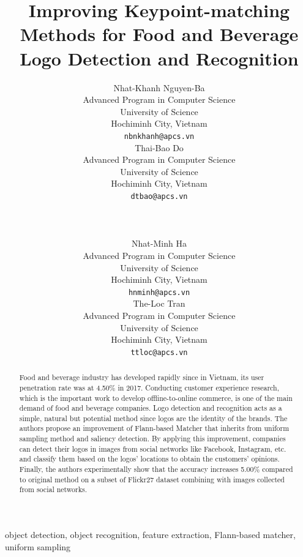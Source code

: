 \documentclass[letterpaper, 10 pt, conference]{ieeeconf}  %
\title{\LARGE \bf
Improving Keypoint-matching Methods for Food and Beverage \\Logo Detection and Recognition
}
\author{ \parbox{3 in}{\centering Nhat-Khanh Nguyen-Ba\\
		 Advanced Program in Computer Science\\
         University of Science\\
         Hochiminh City, Vietnam\\
         {\tt\small nbnkhanh@apcs.vn}}
         \hspace*{ 0.5 in}
         \parbox{3 in}{ \centering Thai-Bao Do\\
         Advanced Program in Computer Science\\
         University of Science\\
         Hochiminh City, Vietnam\\
         {\tt\small dtbao@apcs.vn}}
         \\
         \\
         \parbox{3 in}{ \centering Nhat-Minh Ha\\
         Advanced Program in Computer Science\\
         University of Science\\
         Hochiminh City, Vietnam\\
         {\tt\small hnminh@apcs.vn}}
         \hspace*{ 0.5 in}
         \parbox{3 in}{ \centering The-Loc Tran\\
         Advanced Program in Computer Science\\
         University of Science\\
         Hochiminh City, Vietnam\\
         {\tt\small ttloc@apcs.vn}}
}
\begin{document}
\maketitle
\thispagestyle{empty}
\pagestyle{empty}


\begin{abstract}

Food and beverage industry has developed rapidly since in Vietnam, its user penetration rate was at 4.50\% in 2017. Conducting customer experience research, which is the important work to develop offline-to-online commerce, is one of the main demand of food and beverage companies. Logo detection and recognition acts as a simple, natural but potential method since logos are the identity of the brands. The authors propose an improvement of Flann-based Matcher that inherits from uniform sampling method and saliency detection. By applying this improvement, companies can detect their logos in images from social networks like Facebook, Instagram, etc. and classify them based on the logos’ locations to obtain the customers’ opinions. Finally, the authors experimentally show that the accuracy increases 5.00\% compared to original method on a subset of Flickr27 dataset combining with images collected from social networks.
\end{abstract}
\begin{keywords}
object detection, object recognition, feature extraction, Flann-based matcher, uniform sampling
\end{keywords}

\end{document}
